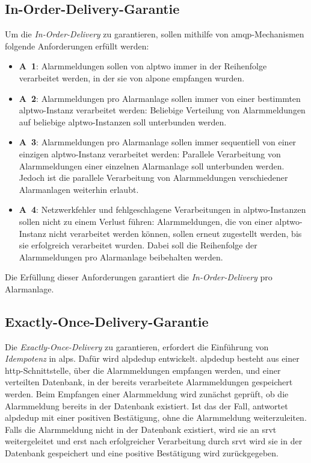 \newpage

\subsection{In-Order-Delivery-Garantie}
\label{sub-sec:alps-in-order-delivery-garantie}

Um die \textit{In-Order-Delivery} zu garantieren, sollen mithilfe von \gls{amqp}-Mechanis\-men folgende Anforderungen erfüllt werden:

\begin{itemize}
    \item \textbf{A~1}: Alarmmeldungen sollen von \gls{alptwo} immer in der Reihenfolge verarbeitet werden, in der sie von \gls{alpone} empfangen wurden.

    \item \textbf{A~2}: Alarmmeldungen pro Alarmanlage sollen immer von einer bestimmten \gls{alptwo}-Instanz verarbeitet werden: Beliebige Verteilung von Alarmmeldungen auf beliebige \gls{alptwo}-Instanzen soll unterbunden werden.

    \item \textbf{A~3}: Alarmmeldungen pro Alarmanlage sollen immer sequentiell von einer einzigen \gls{alptwo}-Instanz verarbeitet werden: Parallele Verarbeitung von Alarmmeldungen einer einzelnen Alarmanlage soll unterbunden werden. Jedoch ist die parallele Verarbeitung von Alarmmeldungen verschiedener Alarmanlagen weiterhin erlaubt.

    \item \textbf{A~4}: Netzwerkfehler und fehlgeschlagene Verarbeitungen in \gls{alptwo}-In\-stan\-zen sollen nicht zu einem Verlust führen: Alarmmeldungen, die von einer \gls{alptwo}-Instanz nicht verarbeitet werden können, sollen erneut zugestellt werden, bis sie erfolgreich verarbeitet wurden. Dabei soll die Reihenfolge der Alarmmeldungen pro Alarmanlage beibehalten werden.
\end{itemize}

Die Erfüllung dieser Anforderungen garantiert die \textit{In-Order-Delivery} pro Alarmanlage.

\subsection{Exactly-Once-Delivery-Garantie}
\label{sub-sec:alps-exactly-once-delivery-garantie}

Die \textit{Exactly-Once-Delivery} zu garantieren, erfordert die Einführung von \textit{Idempotenz} in \gls{alps}. Dafür wird \gls{alpdedup} entwickelt. \gls{alpdedup} besteht aus einer \gls{http}-Schnittstelle, über die Alarmmeldungen empfangen werden, und einer verteilten Datenbank, in der bereits verarbeitete Alarmmeldungen gespeichert werden. Beim Empfangen einer Alarmmeldung wird zunächst geprüft, ob die Alarmmeldung bereits in der Datenbank existiert. Ist das der Fall, antwortet \gls{alpdedup} mit einer positiven Bestätigung, ohne die Alarmmeldung weiterzuleiten. Falls die Alarmmeldung nicht in der Datenbank existiert, wird sie an \gls{srvt} weitergeleitet und erst nach erfolgreicher Verarbeitung durch \gls{srvt} wird sie in der Datenbank gespeichert und eine positive Bestätigung wird zurückgegeben.

